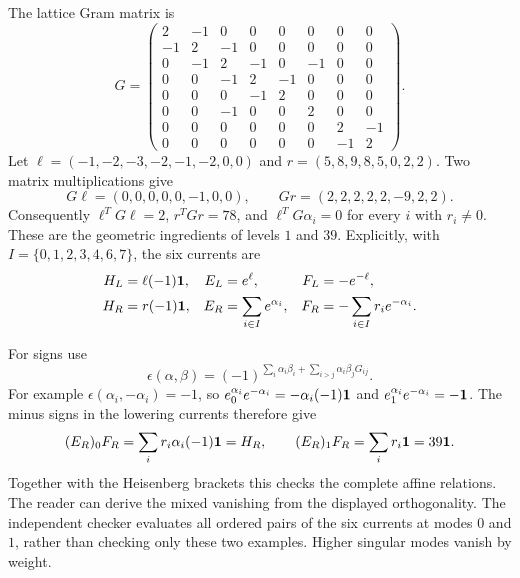The lattice Gram matrix is
\[
G=\begin{pmatrix}
2&-1&0&0&0&0&0&0\\-1&2&-1&0&0&0&0&0\\
0&-1&2&-1&0&-1&0&0\\0&0&-1&2&-1&0&0&0\\
0&0&0&-1&2&0&0&0\\0&0&-1&0&0&2&0&0\\
0&0&0&0&0&0&2&-1\\0&0&0&0&0&0&-1&2
\end{pmatrix}.
\]
Let $\ell=(-1,-2,-3,-2,-1,-2,0,0)$ and
$r=(5,8,9,8,5,0,2,2)$. Two matrix multiplications give
\[
G\ell=(0,0,0,0,0,-1,0,0),\qquad
Gr=(2,2,2,2,2,-9,2,2).
\]
Consequently $\ell^TG\ell=2$, $r^TGr=78$, and
$\ell^TG\alpha_i=0$ for every $i$ with $r_i\ne0$.
These are the geometric ingredients of levels $1$ and $39$.
Explicitly, with $I=\{0,1,2,3,4,6,7\}$, the six currents are
\[
\begin{aligned}
H_L&=\ell(-1)\mathbf1,& E_L&=e^\ell,& F_L&=-e^{-\ell},\\
H_R&=r(-1)\mathbf1,& E_R&=\sum_{i\in I}e^{\alpha_i},&
F_R&=-\sum_{i\in I}r_i e^{-\alpha_i}.
\end{aligned}
\]

For signs use
\[
\epsilon(\alpha,\beta)=(-1)^{\sum_i\alpha_i\beta_i+
 \sum_{i>j}\alpha_i\beta_jG_{ij}}.
\]
For example $\epsilon(\alpha_i,-\alpha_i)=-1$, so
$e^{\alpha_i}_0e^{-\alpha_i}=-\alpha_i(-1)\mathbf1$ and
$e^{\alpha_i}_1e^{-\alpha_i}=-\mathbf1$.
The minus signs in the lowering currents therefore give
\[
(E_R)_0F_R=\sum_i r_i\alpha_i(-1)\mathbf1=H_R,
\qquad (E_R)_1F_R=\sum_i r_i\mathbf1=39\mathbf1.
\]
Together with the Heisenberg brackets this checks the complete affine
relations. The reader can derive the mixed vanishing from the displayed
orthogonality. The independent checker evaluates all ordered pairs of
the six currents at modes $0$ and $1$, rather than checking only these
two examples. Higher singular modes vanish by weight.

